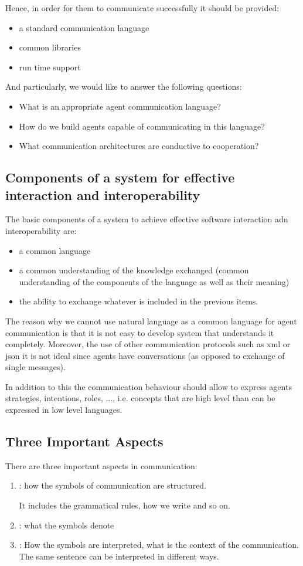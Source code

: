 Hence, in order for them to communicate successfully it should be provided:
\begin{itemize}
\item a standard communication language
\item common libraries
\item run time support
\end{itemize}
And particularly, we would like to answer the following questions:
\begin{itemize}
\item What is an appropriate agent communication language?
\item How do we build agents capable of communicating in this language?
\item What communication architectures are conductive to cooperation?
\end{itemize}

\subsection{Components of a system for effective interaction and interoperability}
The basic components of a system to achieve effective software interaction adn interoperability are:
\begin{itemize}
\item a common language
\item a common understanding of the knowledge exchanged (common understanding of the components of the language as well as their meaning)
\item the ability to exchange whatever is included in the previous items.
\end{itemize}

The reason why we cannot use natural language as a common language for agent communication is that it is not easy to develop system that understands it completely. 
Moreover, the use of other communication protocols such as xml or json it is not ideal since agents have conversations (as opposed to exchange of single messages).

In addition to this the communication behaviour should allow to express agents strategies, intentions, roles, ..., i.e. concepts that are high level than can be expressed in low level languages.

\subsection{Three Important Aspects}
There are three important aspects in communication:
\begin{enumerate}
\item {}: how the symbols of communication are structured.

It includes the grammatical rules, how we write and so on.
\item {}: what the symbols denote
\item {}: How the symbols are interpreted, what is the context of the communication. The same sentence can be interpreted in different ways.
\end{enumerate} 

